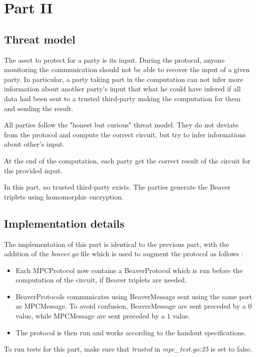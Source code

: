 \documentclass[10pt,conference]{IEEEtran}
\begin{document}
\section{Part II}
\subsection{Threat model}
The asset to protect for a party is its input. During the protocol, anyone monitoring the communication should not be able to recover the input of a given party. In particular, a party taking part in the computation can not infer more information about another party's input that what he could have infered if all data had been sent to a trusted third-party making the computation for them and sending the result.

All parties follow the "honest but curious" threat model. They do not deviate from the protocol and compute the correct circuit, but try to infer informations about other's input.

At the end of the computation, each party get the correct result of the circuit for the provided input.

In this part, no trusted third-party exists. The parties generate the Beaver triplets using homomorphic encryption.

\subsection{Implementation details}
The implementation of this part is identical to the previous part, with the addition of the \textit{beaver.go} file which is used to augment the protocol as follows : 
\begin{itemize}
    \item Each MPCProtocol now contains a BeaverProtocol which is run before the computation of the circuit, if Beaver triplets are needed.
    \item BeaverProtocols communicates using BeaverMessage sent using the same port as MPCMessage. To avoid confusion, BeaverMessage are sent preceded by a $0$ value, while MPCMessage are sent preceded by a $1$ value.
    \item The protocol is then run and works according to the handout specifications.
\end{itemize}
To run tests for this part, make sure that \textit{trusted} in \textit{mpc\_test.go:25} is set to false.
\end{document}
